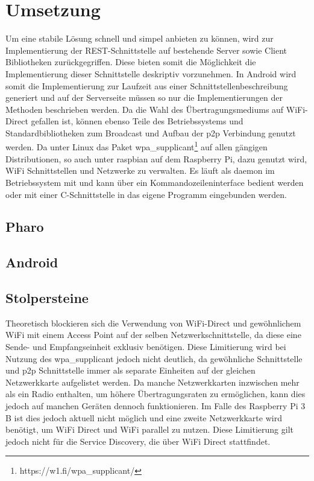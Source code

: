\section{Umsetzung}
Um eine stabile Lösung schnell und simpel anbieten zu können, wird zur Implementierung der REST-Schnittstelle auf bestehende Server sowie Client Bibliotheken zurückgegriffen. Diese bieten somit die Möglichkeit die Implementierung dieser Schnittstelle deskriptiv vorzunehmen. In Android wird somit die Implementierung zur Laufzeit aus einer Schnittstellenbeschreibung generiert und auf der Serverseite müssen so nur die Implementierungen der Methoden beschrieben werden. Da die Wahl des Übertragungsmediums auf WiFi-Direct gefallen ist, können ebenso Teile des Betriebssystems und Standardbibliotheken zum Broadcast und Aufbau der p2p Verbindung genutzt werden.
Da unter Linux das Paket wpa\_supplicant\footnote{https://w1.fi/wpa\_supplicant/} auf allen gängigen Distributionen, so auch unter raspbian auf dem Raspberry Pi, dazu genutzt wird, WiFi Schnittstellen und Netzwerke zu verwalten. Es läuft als daemon im Betriebssystem mit und kann über ein Kommandozeileninterface bedient werden oder mit einer C-Schnittstelle in das eigene Programm eingebunden werden.
\subsection{Pharo}
\subsection{Android}

\subsection{Stolpersteine}
Theoretisch blockieren sich die Verwendung von WiFi-Direct und gewöhnlichem WiFi mit einem Access Point auf der selben Netzwerkschnittstelle, da diese eine Sende- und Empfangseinheit exklusiv benötigen. Diese Limitierung wird bei Nutzung des wpa\_supplicant jedoch nicht deutlich, da gewöhnliche Schnittstelle und p2p Schnittstelle immer als separate Einheiten auf der gleichen Netzwerkkarte aufgelistet werden. Da manche Netzwerkkarten inzwischen mehr als ein Radio enthalten, um höhere Übertragungsraten zu ermöglichen, kann dies jedoch auf manchen Geräten dennoch funktionieren. Im Falle des Raspberry Pi 3 B ist dies jedoch aktuell nicht möglich und eine zweite Netzwerkkarte wird benötigt, um WiFi Direct und WiFi parallel zu nutzen. Diese Limitierung gilt jedoch nicht für die Service Discovery, die über WiFi Direct stattfindet.